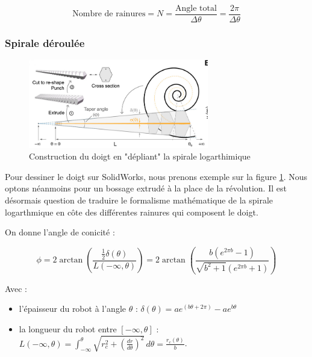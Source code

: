 \documentclass[a4paper, 11pt]{report}
\begin{document}
            \begin{equation}
            \text{Nombre de rainures} = N = \frac{\text{Angle total}}{\Delta\theta} = \frac{2\pi}{\Delta\theta}
            \label{eq:nb_segment}
            \end{equation}

        \subsubsection{Spirale déroulée}

            \begin{figure}
                \centering
                \includegraphics[width=0.7\textwidth]{Figures/draw_solidworks.png}
                \caption{Construction du doigt en "dépliant" la spirale logarthimique \cite{wang_spirobs_2025}}
                \label{fig:draw_solidworks}
            \end{figure}

            Pour dessiner le doigt sur SolidWorks, nous prenons exemple sur la figure \ref{fig:draw_solidworks}. Nous optons néanmoins pour un bossage extrudé à la place de la révolution. Il est désormais question de traduire le formalisme mathématique de la spirale logarthmique en côte des différentes rainures qui composent le doigt.

            On donne l'angle de conicité :

            \begin{equation}
            \phi = 2\arctan \left(
                \frac{\frac{1}{2}\delta(\theta)}{L(-\infty, \theta)}
                \right) = 2 \arctan\left(\frac{b(e^{2\pi b}-1)}{\sqrt{b^2+1} \left(e^{2\pi b}+1\right)}\right)
            \label{eq:angle_de_conicite}
            \end{equation}

            Avec :

            \begin{itemize}
                \item l'épaisseur du robot à l'angle $\theta$ : $\delta(\theta) = ae^{(b\theta + 2\pi)} - ae^{b\theta}$
                \item la longueur du robot entre $[-\infty,\theta]$ : $L(-\infty, \theta) = \int_{-\infty}^{\theta} \sqrt{r_c^2 + \left(\frac{dr}{d\theta}\right)^2} \, d\theta = \frac{r_c(\theta)}{b}$.
            \end{itemize}
\end{document}
